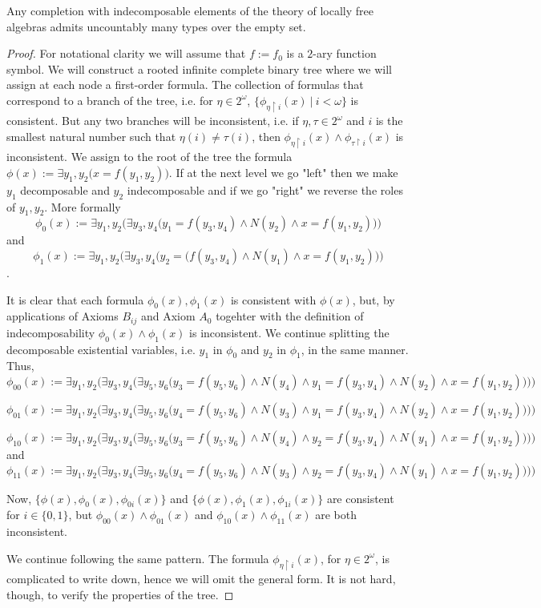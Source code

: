 \documentclass[a4paper,11pt]{article}
\begin{document}
\begin{proposition}\label{UncountableTypes}
Any completion with indecomposable elements of the theory of locally free algebras admits uncountably many types over the empty set. 
\end{proposition}
\begin{proof}
For notational clarity we will assume that $f:=f_0$ is a $2$-ary function symbol. We will construct a rooted infinite complete binary tree where we will assign at each node a first-order formula. The collection of formulas that correspond to a branch of the tree, i.e. for  $\eta\in 2^{\omega}$, $\{\phi_{\eta\upharpoonright i}(x) \ | \ i<\omega\}$ is consistent. But any two branches will be inconsistent, i.e. if $\eta, \tau\in 2^{\omega}$ and $i$ is the smallest natural number such that $\eta(i)\neq \tau(i)$, then $\phi_{\eta\upharpoonright i}(x)\land \phi_{\tau\upharpoonright i}(x)$ is inconsistent. We assign to the root of the tree the formula $\phi(x):=\exists y_1,y_2 \big( x= f(y_1,y_2)\big)$. If at the next level we go "left" then we make $y_1$ decomposable and $y_2$ indecomposable and if we go "right" we reverse the roles of $y_1, y_2$. More formally 
$$\phi_0(x):=\exists y_1,y_2 \Big(\exists y_3,y_4 \big(y_1=f(y_3,y_4)\land N(y_2)\land x= f(y_1,y_2)\big)\Big) $$ and 
$$\phi_1(x):=\exists y_1,y_2 \Big(\exists y_3,y_4 \big(y_2=(f(y_3,y_4)\land N(y_1)\land x= f(y_1,y_2)\big)\Big)$$. 

It is clear that each formula $\phi_0(x), \phi_1(x)$ is consistent with $\phi(x)$, but, by applications of Axioms $B_{ij}$ and Axiom $A_0$ togehter with the definition of indecomposability $\phi_0(x)\land\phi_1(x)$ is inconsistent.  We continue splitting the decomposable existential variables, i.e. $y_1$ in $\phi_0$ and $y_2$ in $\phi_1$, in the same manner. Thus, 
$$\phi_{00}(x):=\exists y_1,y_2 \Bigg(\exists y_3,y_4 \Big( \exists y_5, y_6 \big(y_3=f(y_5,y_6)\land N(y_4)\land y_1=f(y_3,y_4)\land N(y_2)\land x= f(y_1,y_2)\big)\Big)\Bigg) $$

$$\phi_{01}(x):=\exists y_1,y_2 \Bigg(\exists y_3,y_4 \Big( \exists y_5, y_6 \big(y_4=f(y_5,y_6)\land N(y_3)\land y_1=f(y_3,y_4)\land N(y_2)\land x= f(y_1,y_2)\big)\Big)\Bigg) $$

$$\phi_{10}(x):=\exists y_1,y_2 \Bigg(\exists y_3,y_4 \Big( \exists y_5, y_6 \big(y_3=f(y_5,y_6)\land N(y_4)\land y_2=f(y_3,y_4)\land N(y_1)\land x= f(y_1,y_2)\big)\Big)\Bigg) $$
and 
$$\phi_{11}(x):=\exists y_1,y_2 \Bigg(\exists y_3,y_4 \Big( \exists y_5, y_6 \big(y_4=f(y_5,y_6)\land N(y_3)\land y_2=f(y_3,y_4)\land N(y_1)\land x= f(y_1,y_2)\big)\Big)\Bigg) $$

Now, $\{\phi(x), \phi_0(x), \phi_{0i}(x)\}$ and $\{\phi(x), \phi_1(x), \phi_{1i}(x)\}$ are consistent for $i\in\{0,1\}$, but $\phi_{00}(x)\land\phi_{01}(x)$ and $\phi_{10}(x)\land\phi_{11}(x)$ are both inconsistent. 

We continue following the same pattern. The formula $\phi_{\eta\upharpoonright i}(x)$, for $\eta\in 2^{\omega}$, is complicated to write down, hence we will omit the general form. It is not hard, though, to verify the properties of the tree. 
\end{proof}
\end{document}
